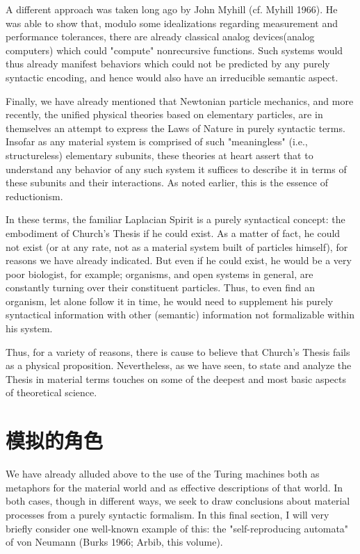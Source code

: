 \documentclass[a4paper,12pt]{article}
\begin{document}
A different approach was taken long ago by John Myhill (cf. Myhill 1966).
He was able to show that, modulo some idealizations regarding measurement and performance tolerances, there are already
classical analog devices(analog computers) which could "compute" nonrecursive functions. Such systems would thus already
manifest behaviors which could not be predicted by any purely syntactic encoding, and hence would also have an irreducible
semantic aspect.

Finally, we have already mentioned that Newtonian particle mechanics, and more recently, the unified physical theories based on elementary particles,
are in themselves an attempt to express the Laws of Nature in purely syntactic terms. Insofar as any material system is comprised of such "meaningless"
(i.e., structureless) elementary subunits, these theories at heart assert that to understand any behavior of any
such system it suffices to describe it in terms of these subunits and their interactions. As noted earlier, this is the essence of reductionism.

In these terms, the familiar Laplacian Spirit is a purely syntactical concept: the embodiment of Church's Thesis if he could exist.  As a matter
of fact, he could not exist (or at any rate, not as a material system built of particles himself), for reasons we have already indicated.
But even if he could exist, he would be a very poor biologist, for example; organisms, and open systems in general, are constantly turning over their
constituent particles. Thus, to even find an organism, let alone follow it in time, he would need to supplement his purely syntactical
information with other (semantic) information not formalizable within his system.

Thus, for a variety of reasons, there is cause to believe that Church's Thesis fails as a physical proposition. Nevertheless,
as we have seen, to state and analyze the Thesis in material terms touches on some of the deepest and most basic aspects of theoretical science.

\section{模拟的角色}

We have already alluded above to the use of the Turing machines both
as metaphors for the material world and as effective descriptions of that
world.  In both cases, though in different ways, we seek to draw conclusions
about material processes from a purely syntactic formalism. In this final section,
I will very briefly consider one well-known example of this:
the "self-reproducing automata" of von Neumann (Burks 1966; Arbib, this volume).
\end{document}
